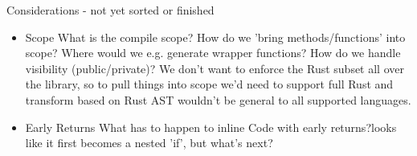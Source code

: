 \begin{enumerate}
\end{enumerate}

Considerations - not yet sorted or finished
\begin{itemize}
    \item Scope \means What is the compile scope? How do we 'bring methods/functions' into scope? Where would we e.g. generate wrapper functions? How do we handle visibility (public/private)? We don't want to enforce the Rust subset all over the library, so to pull things into scope we'd need to support full Rust and transform based on Rust AST \means wouldn't be general to all supported languages.
    \item Early Returns \means What has to happen to inline Code with early returns?\means looks like it first becomes a nested 'if', but what's next?    
\end{itemize}



